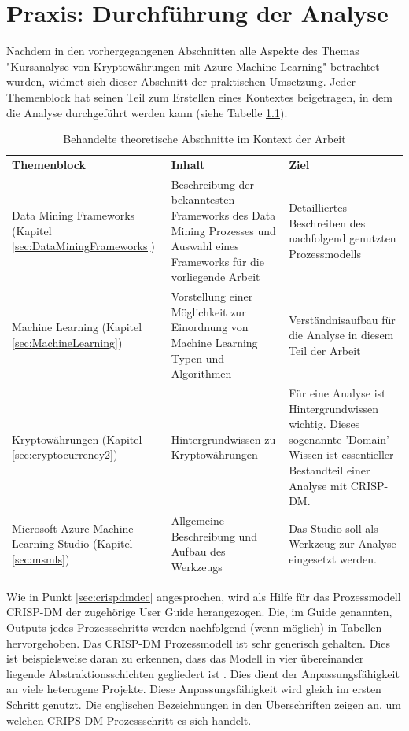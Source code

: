 \chapter{Praxis: Durchführung der Analyse}\label{chap:praxis}
Nachdem in den vorhergegangenen Abschnitten alle Aspekte des Themas "Kursanalyse von Kryptowährungen mit Azure Machine Learning" betrachtet wurden, widmet sich dieser Abschnitt der praktischen Umsetzung. Jeder Themenblock hat seinen Teil zum Erstellen eines Kontextes beigetragen, in dem die Analyse durchgeführt werden kann (siehe Tabelle \ref{tab:themeblocks}).
\begin{table}[H]
\begin{tabular}{|p{}|p{6cm}|p{7cm}|}
\hline
\textbf{Themenblock} & \textbf{Inhalt} & \textbf{Ziel}\\ 
\hhline{===}
Data Mining Frameworks (Kapitel \ref{sec:DataMiningFrameworks}) & Beschreibung der bekanntesten Frameworks des Data Mining Prozesses und Auswahl eines Frameworks für die vorliegende Arbeit & Detailliertes Beschreiben des nachfolgend genutzten Prozessmodells\\
\hline
Machine Learning (Kapitel \ref{sec:MachineLearning}) & Vorstellung einer Möglichkeit zur Einordnung von Machine Learning Typen und Algorithmen & Verständnisaufbau für die Analyse in diesem Teil der Arbeit\\
\hline
Kryptowährungen (Kapitel \ref{sec:cryptocurrency2}) & Hintergrundwissen zu Kryptowährungen & Für eine Analyse ist Hintergrundwissen wichtig. Dieses sogenannte 'Domain'-Wissen ist essentieller Bestandteil einer Analyse mit CRISP-DM. \\
\hline
Microsoft Azure Machine Learning Studio (Kapitel \ref{sec:msmls}) & Allgemeine Beschreibung und Aufbau des Werkzeugs & Das Studio soll als Werkzeug zur Analyse eingesetzt werden.\\
\hline
\end{tabular}
\caption{Behandelte theoretische Abschnitte im Kontext der Arbeit}
\label{tab:themeblocks}
\end{table}
Wie in Punkt \ref{sec:crispdmdec} angesprochen, wird als Hilfe für das Prozessmodell CRISP-DM der zugehörige User Guide \citep[S.~30-56]{chapman_crisp-dm_2000} herangezogen. Die, im Guide genannten, Outputs jedes Prozessschritts werden nachfolgend (wenn möglich) in Tabellen hervorgehoben. Das CRISP-DM Prozessmodell ist sehr generisch gehalten. Dies ist beispielsweise daran zu erkennen, dass das Modell in vier übereinander liegende Abstraktionsschichten gegliedert ist \citep[S.~6]{chapman_crisp-dm_2000}. Dies dient der Anpassungsfähigkeit an viele heterogene Projekte. Diese Anpassungsfähigkeit wird gleich im ersten Schritt genutzt. Die englischen Bezeichnungen in den Überschriften zeigen an, um welchen CRIPS-DM-Prozessschritt es sich handelt.
 
